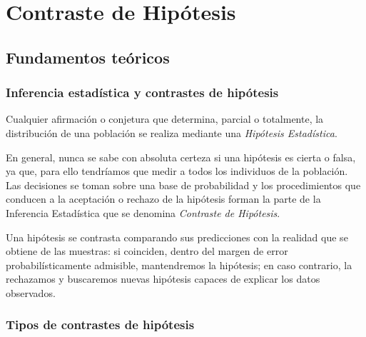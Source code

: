 
\chapter{Contraste de Hipótesis}

\section{Fundamentos teóricos}
\subsection{Inferencia estadística y contrastes de hipótesis}
Cualquier afirmación o conjetura que determina, parcial o totalmente, la distribución de una población se realiza mediante una \emph{Hipótesis Estadística}.

En general, nunca se sabe con absoluta certeza si una hipótesis es
cierta o falsa, ya que, para ello tendríamos que medir a todos los individuos de la población. Las decisiones se toman sobre una base de
probabilidad y los procedimientos que conducen a la aceptación o
rechazo de la hipótesis forman la parte de la Inferencia
Estadística que se denomina \emph{Contraste de Hipótesis}.

Una hipótesis se contrasta comparando sus predicciones con la
realidad que se obtiene de las muestras: si coinciden, dentro del
margen de error probabilísticamente admisible, mantendremos la
hipótesis; en caso contrario, la rechazamos y buscaremos nuevas
hipótesis capaces de explicar los datos observados.

\subsection{Tipos de contrastes de hipótesis}

